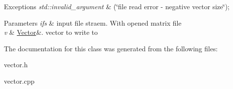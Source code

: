 \begin{DoxyExceptions}{Exceptions}
{\em std\+::invalid\+\_\+argument} & (\char`\"{}file read error -\/ negative vector size\char`\"{}); \\
\hline
\end{DoxyExceptions}

\begin{DoxyParams}{Parameters}
{\em ifs} & input file straem. With opened matrix file \\
\hline
{\em v} & \mbox{\hyperlink{classVector}{Vector}}\&. vector to write to \\
\hline
\end{DoxyParams}


The documentation for this class was generated from the following files\+:\begin{DoxyCompactItemize}
\item 
vector.\+h\item 
vector.\+cpp\end{DoxyCompactItemize}
